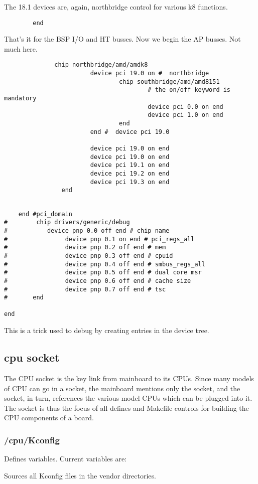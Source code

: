 \documentclass[10pt,letterpaper]{article}
\begin{document}
The 18.1 devices are, again, northbridge control for various k8 functions. 
\begin{verbatim}
		end
  \end{verbatim}
That's it for the BSP I/O and HT busses. Now we begin the AP busses. Not much here. 
\begin{verbatim}
              chip northbridge/amd/amdk8
                        device pci 19.0 on #  northbridge
                                chip southbridge/amd/amd8151
                                        # the on/off keyword is mandatory
                                        device pci 0.0 on end
                                        device pci 1.0 on end
                                end
                        end #  device pci 19.0

                        device pci 19.0 on end
                        device pci 19.0 on end
                        device pci 19.1 on end
                        device pci 19.2 on end
                        device pci 19.3 on end
                end


\end{verbatim}
\begin{verbatim}
	end #pci_domain
#        chip drivers/generic/debug
#        	device pnp 0.0 off end # chip name
#                device pnp 0.1 on end # pci_regs_all
#                device pnp 0.2 off end # mem
#                device pnp 0.3 off end # cpuid
#                device pnp 0.4 off end # smbus_regs_all
#                device pnp 0.5 off end # dual core msr
#                device pnp 0.6 off end # cache size
#                device pnp 0.7 off end # tsc
#       end

end
\end{verbatim}
This is a trick used to debug by creating entries in the device tree. 

\subsection{cpu socket}
The CPU socket is the key link from mainboard to its CPUs. Since many models of CPU can go in a socket, the mainboard mentions only 
the socket, and the socket, in turn, references the various model CPUs which can be plugged into it. The socket is thus the focus 
of all defines and Makefile controls for building the CPU components of a board. 

\subsubsection{ /cpu/Kconfig}
Defines variables. Current variables are: 

Sources all Kconfig files in the vendor directories. 
\end{document}
